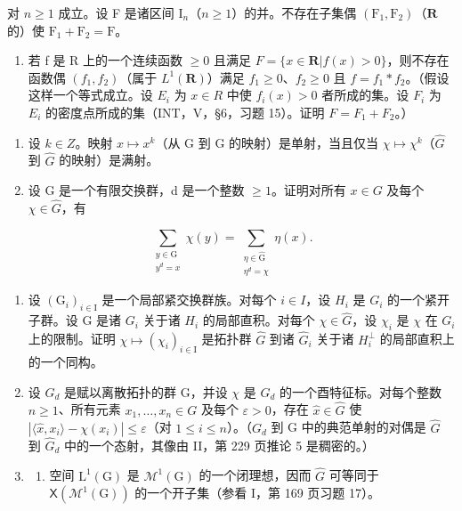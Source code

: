 对 \(n \geqslant 1\) 成立。设 F 是诸区间 \(\mathrm{I}_n\)（\(n \geqslant 1\)）的并。不存在子集偶 \((\mathrm{F}_1, \mathrm{F}_2)\)（\(\mathbf{R}\) 的）使 \(\mathrm{F}_1 + \mathrm{F}_2 = \mathrm{F}\)。

\begin{enumerate}
\def\labelenumi{\alph{enumi})}
\setcounter{enumi}{3}
\tightlist
\item
  若 f 是 R 上的一个连续函数 \(\geqslant 0\) 且满足 \(F = \{x \in \mathbf{R} | f(x) > 0\}\)，则不存在函数偶 \((f_{1}, f_{2})\)（属于 \(L^{1}(\mathbf{R})\)）满足 \(f_{1} \geqslant 0\)、\(f_{2} \geqslant 0\) 且 \(f = f_{1} * f_{2}\)。（假设这样一个等式成立。设 \(E_{i}\) 为 \(x \in R\) 中使 \(f_{i}(x) > 0\) 者所成的集。设 \(F_{i}\) 为 \(E_{i}\) 的密度点所成的集（INT，V，§6，习题 15）。证明 \(F = F_{1} + F_{2}\)。）
\end{enumerate}

\begin{enumerate}
\def\labelenumi{\arabic{enumi})}
\setcounter{enumi}{9}
\item
  设 \(k \in Z\)。映射 \(x \mapsto x^{k}\)（从 G 到 G 的映射）是单射，当且仅当 \(\chi \mapsto \chi^{k}\)（\(\widehat{G}\) 到 \(\widehat{G}\) 的映射）是满射。
\item
  设 G 是一个有限交换群，d 是一个整数 \(\geqslant 1\)。证明对所有 \(x \in G\) 及每个 \(\chi \in \widehat{G}\)，有
\end{enumerate}

\[
\sum_{\substack{y\in \mathrm{G}\\ y^{d} = x}}\chi (y) = \sum_{\substack{\eta \in \widehat{\mathrm{G}}\\ \eta^{d} = \chi}}\eta (x).
\]

\begin{enumerate}
\def\labelenumi{\arabic{enumi})}
\setcounter{enumi}{11}
\item
  设 \((\mathrm{G}_{i})_{i\in\mathrm{I}}\) 是一个局部紧交换群族。对每个 \(i\in I\)，设 \(H_{i}\) 是 \(G_{i}\) 的一个紧开子群。设 G 是诸 \(G_{i}\) 关于诸 \(H_{i}\) 的局部直积。对每个 \(\chi\in\widehat{G}\)，设 \(\chi_{i}\) 是 \(\chi\) 在 \(G_{i}\) 上的限制。证明 \(\chi\mapsto(\chi_{i})_{i\in\mathrm{I}}\) 是拓扑群 \(\widehat{G}\) 到诸 \(\widehat{G}_{i}\) 关于诸 \(H_{i}^{\perp}\) 的局部直积上的一个同构。
\item
  设 \(G_{d}\) 是赋以离散拓扑的群 G，并设 \(\chi\) 是 \(G_{d}\) 的一个酉特征标。对每个整数 \(n \geqslant 1\)、所有元素 \(x_{1}, \ldots, x_{n} \in G\) 及每个 \(\varepsilon > 0\)，存在 \(\widehat{x} \in \widehat{G}\) 使 \(|\langle\widehat{x}, x_{i}\rangle - \chi(x_{i})| \leqslant \varepsilon\)（对 \(1 \leqslant i \leqslant n\)）。（\(G_{d}\) 到 G 中的典范单射的对偶是 \(\widehat{G}\) 到 \(\widehat{G}_{d}\) 中的一个态射，其像由 II，第 229 页推论 5 是稠密的。）
\item
  \begin{enumerate}
  \def\labelenumii{\alph{enumii})}
  \tightlist
  \item
    空间 \(\mathrm{L}^{1}(\mathrm{G})\) 是 \(\mathcal{M}^{1}(\mathrm{G})\) 的一个闭理想，因而 \(\widehat{G}\) 可等同于 \(\mathsf{X}(\mathcal{M}^{1}(\mathrm{G}))\) 的一个开子集（参看 I，第 169 页习题 17）。
  \end{enumerate}
\end{enumerate}

